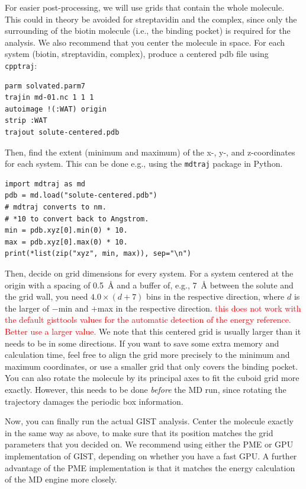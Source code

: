 \documentclass[9pt,tutorial]{livecoms}
\newcommand{\software}{\texttt}
\newcommand{\todo}{\textcolor{red}}
\begin{document}
For easier post-processing, we will use grids that contain the whole molecule.
This could in theory be avoided for streptavidin and the complex, since only the surrounding of the biotin molecule (i.e., the binding pocket) is required for the analysis.
We also recommend that you center the molecule in space.
For each system (biotin, streptavidin, complex), produce a centered pdb file using \software{cpptraj}:
\begin{lstlisting}
parm solvated.parm7
trajin md-01.nc 1 1 1
autoimage !(:WAT) origin
strip :WAT
trajout solute-centered.pdb
\end{lstlisting}
Then, find the extent (minimum and maximum) of the x-, y-, and z-coordinates for each system.
This can be done e.g., using the \software{mdtraj} package in Python.
\begin{lstlisting}[style=python]
import mdtraj as md
pdb = md.load("solute-centered.pdb")
# mdtraj converts to nm.
# *10 to convert back to Angstrom.
min = pdb.xyz[0].min(0) * 10.
max = pdb.xyz[0].max(0) * 10.
print(*list(zip("xyz", min, max)), sep="\n")
\end{lstlisting}
Then, decide on grid dimensions for every system.
For a system centered at the origin with a spacing of \SI{0.5}{\angstrom} and a buffer of, e.g., \SI{7}{\angstrom} between the solute and the grid wall, you need $4.0\times (d+7)$ bins in the respective direction, where $d$ is the larger of $-$min and $+$max in the respective direction.
\todo{this does not work with the default gisttools values for the automatic detection of the energy reference. Better use a larger value. }
We note that this centered grid is usually larger than it needs to be in some directions.
If you want to save some extra memory and calculation time, feel free to align the grid more precisely to the minimum and maximum coordinates, or use a smaller grid that only covers the binding pocket.
You can also rotate the molecule by its principal axes to fit the cuboid grid more exactly.
However, this needs to be done \emph{before} the MD run, since rotating the trajectory damages the periodic box information.

Now, you can finally run the actual GIST analysis. Center the molecule exactly in the same way as above, to make sure that its position matches the grid parameters that you decided on.
We recommend using either the PME or GPU implementation of GIST, depending on whether you have a fast GPU.
A further advantage of the PME implementation is that it matches the energy calculation of the MD engine more closely.
\end{document}
